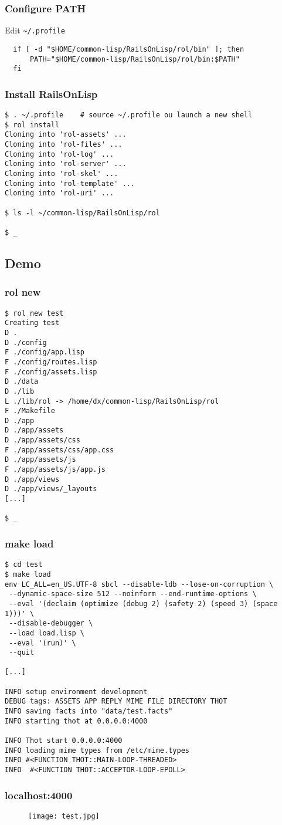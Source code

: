 \documentclass[8pt]{beamer}
\begin{document}
\begin{frame}[fragile]
  \frametitle{Configure PATH}
  Edit \tt{\textasciitilde/.profile}
\begin{verbatim}
  if [ -d "$HOME/common-lisp/RailsOnLisp/rol/bin" ]; then
      PATH="$HOME/common-lisp/RailsOnLisp/rol/bin:$PATH"
  fi
\end{verbatim}
\end{frame}

\begin{frame}[fragile]
  \frametitle{Install RailsOnLisp}
\begin{verbatim}
$ . ~/.profile    # source ~/.profile ou launch a new shell
$ rol install
Cloning into 'rol-assets' ...
Cloning into 'rol-files' ...
Cloning into 'rol-log' ...
Cloning into 'rol-server' ...
Cloning into 'rol-skel' ...
Cloning into 'rol-template' ...
Cloning into 'rol-uri' ...

$ ls -l ~/common-lisp/RailsOnLisp/rol

$ _
\end{verbatim}
\end{frame}

\subsection{Demo}

\begin{frame}[fragile]
  \frametitle{rol new}
\begin{verbatim}
$ rol new test
Creating test
D .
D ./config
F ./config/app.lisp
F ./config/routes.lisp
F ./config/assets.lisp
D ./data
D ./lib
L ./lib/rol -> /home/dx/common-lisp/RailsOnLisp/rol
F ./Makefile
D ./app
D ./app/assets
D ./app/assets/css
F ./app/assets/css/app.css
D ./app/assets/js
F ./app/assets/js/app.js
D ./app/views
D ./app/views/_layouts
[...]

$ _
\end{verbatim}
\end{frame}

\begin{frame}[fragile]
  \frametitle{make load}
\begin{verbatim}
$ cd test
$ make load
env LC_ALL=en_US.UTF-8 sbcl --disable-ldb --lose-on-corruption \
 --dynamic-space-size 512 --noinform --end-runtime-options \
 --eval '(declaim (optimize (debug 2) (safety 2) (speed 3) (space 1)))' \
 --disable-debugger \
 --load load.lisp \
 --eval '(run)' \
 --quit

[...]

INFO setup environment development
DEBUG tags: ASSETS APP REPLY MIME FILE DIRECTORY THOT
INFO saving facts into "data/test.facts"
INFO starting thot at 0.0.0.0:4000

INFO Thot start 0.0.0.0:4000
INFO loading mime types from /etc/mime.types
INFO #<FUNCTION THOT::MAIN-LOOP-THREADED>
INFO  #<FUNCTION THOT::ACCEPTOR-LOOP-EPOLL>
\end{verbatim}
\end{frame}

\begin{frame}[fragile]
  \frametitle{localhost:4000}
  \begin{figure}[h!]
    \centering
    \texttt{[image: test.jpg]}
    \label{localhost:4000}
  \end{figure}
\end{frame}
\end{document}
